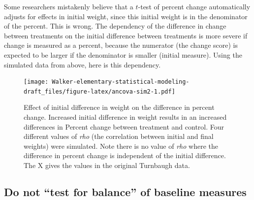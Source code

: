 \documentclass[]{book}
\begin{document}
Some researchers mistakenly believe that a \(t\)-test of percent change
automatically adjusts for effects in initial weight, since this initial
weight is in the denominator of the percent. This is wrong. The
dependency of the difference in change between treatments on the initial
difference between treatments is more severe if change is measured as a
percent, because the numerator (the change score) is expected to be
larger if the denominator is smaller (initial measure). Using the
simulated data from above, here is this dependency.

\begin{figure}
\centering
\texttt{[image: Walker-elementary-statistical-modeling-draft\_files/figure-latex/ancova-sim2-1.pdf]}
\caption{\label{fig:ancova-sim2}Effect of initial difference in weight on
the difference in percent change. Increased initial difference in weight
results in an increased differences in Percent change between treatment
and control. Four different values of \emph{rho} (the correlation
between initial and final weights) were simulated. Note there is no
value of \emph{rho} where the difference in percent change is
independent of the initial difference. The X gives the values in the
original Turnbaugh data.}
\end{figure}

\subsection{\texorpdfstring{Do not ``test for balance'' of baseline
measures}{Do not test for balance of baseline measures}}\label{do-not-test-for-balance-of-baseline-measures}
\end{document}
